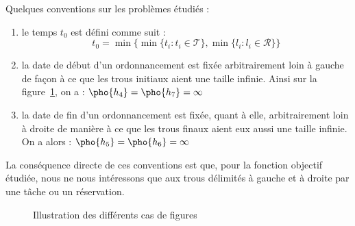 \documentclass[a4paper,11pt]{thesis}
\begin{document}
\begin{nrmq}
    Quelques conventions sur les problèmes étudiés : \begin{enumerate}
        \item le temps $t_0$ est défini comme suit : \[
                t_0 = \min\{\min\{t_i : t_i \in \mathcal{T}\}, \min\{l_i : l_i \in \mathcal{R}\}\}
            \]
        \item la date de début d'un ordonnancement est fixée arbitrairement loin à gauche de façon à
            ce que les trous initiaux aient une taille infinie. Ainsi sur la figure~\ref{prescas},
            on a : $\pho{h_4} = \pho{h_7} = \infty$
        \item la date de fin d'un ordonnancement est fixée, quant à elle, arbitrairement loin à
            droite de manière à ce que les trous finaux aient eux aussi une taille infinie. On a
            alors : $\pho{h_5} = \pho{h_6} = \infty$
    \end{enumerate}

    La conséquence directe de ces conventions est que, pour la fonction objectif étudiée, nous ne
    nous intéressons que aux trous délimités à gauche et à droite par une tâche ou un réservation.
\end{nrmq}

\begin{figure}
    \begin{center}
        \begin{ordo}[8]{3}{1}{8}




        \end{ordo}
    \end{center}
    \caption{Illustration des différents cas de figures}
    \label{prescas}
\end{figure}
\end{document}
